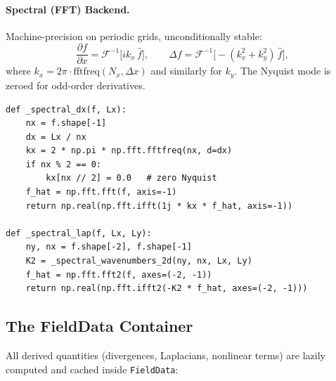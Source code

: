 \documentclass[11pt]{article}
\begin{document}
\paragraph{Spectral (FFT) Backend.}
Machine-precision on periodic grids, unconditionally stable:
\begin{equation}
  \frac{\partial f}{\partial x}
  = \mathcal{F}^{-1}\bigl[ik_x\,\hat{f}\bigr],
  \qquad
  \Delta f = \mathcal{F}^{-1}\bigl[-(k_x^2 + k_y^2)\,\hat{f}\bigr],
\end{equation}
where $k_x = 2\pi \cdot \text{fftfreq}(N_x, \Delta x)$ and similarly
for $k_y$.  The Nyquist mode is zeroed for odd-order derivatives.

\begin{lstlisting}[caption={fields.py --- Spectral derivatives}]
def _spectral_dx(f, Lx):
    nx = f.shape[-1]
    dx = Lx / nx
    kx = 2 * np.pi * np.fft.fftfreq(nx, d=dx)
    if nx % 2 == 0:
        kx[nx // 2] = 0.0   # zero Nyquist
    f_hat = np.fft.fft(f, axis=-1)
    return np.real(np.fft.ifft(1j * kx * f_hat, axis=-1))

def _spectral_lap(f, Lx, Ly):
    ny, nx = f.shape[-2], f.shape[-1]
    K2 = _spectral_wavenumbers_2d(ny, nx, Lx, Ly)
    f_hat = np.fft.fft2(f, axes=(-2, -1))
    return np.real(np.fft.ifft2(-K2 * f_hat, axes=(-2, -1)))
\end{lstlisting}


\subsection{The FieldData Container}

All derived quantities (divergences, Laplacians, nonlinear terms) are
lazily computed and cached inside \texttt{FieldData}:
\end{document}
